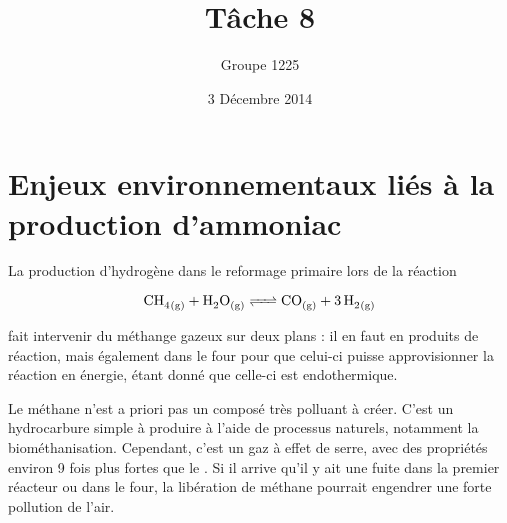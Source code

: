 \documentclass[a4paper, oneside, 12pt]{article}
\title{Tâche 8}
\author{Groupe 1225}
\date{3 Décembre 2014}
\begin{document}
\maketitle

\section*{Enjeux environnementaux liés à la production d'ammoniac}

La production d'hydrogène dans le reformage primaire lors de la réaction

\begin{equation*}
	\ce{CH4_{(g)} + H2O_{(g)} <=> CO_{(g)} + 3 \, H2_{(g)}} 
\end{equation*}

fait intervenir du méthange gazeux sur deux plans : il en faut en produits de réaction, 
mais également dans le four pour que celui-ci puisse approvisionner la réaction en énergie, étant donné que celle-ci est endothermique. 

Le méthane n'est a priori pas un composé très polluant à créer. C'est un hydrocarbure simple à produire à l'aide de processus naturels, notamment la biométhanisation. 
Cependant, c'est un gaz à effet de serre, avec des propriétés environ 9 fois plus fortes que le . 
Si il arrive qu'il y ait une fuite dans la premier réacteur ou dans le four, la libération de méthane pourrait engendrer une forte pollution de l'air.
\end{document}
